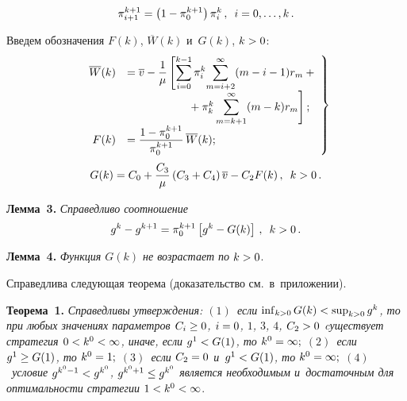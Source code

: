 \begin{multicols}{2}
  \vspace*{-6pt}
  
  \noindent
  \begin{equation}
  \pi_{i+1}^{k+1}=\left(1- \pi_0^{k+1}\right) \pi_i^k\,,\enskip i=0,\ldots, k\,.
  \label{e10-aga}
  \end{equation}
  
  {Введем обозначения} $F(k)$, $\overline{W}(k)$ и~$G(k)$, $k\hm>0$:
  \begin{equation}
  \left.
  \begin{array}{rl}
  \hspace*{-1mm}\overline{W}(k) &  = \displaystyle
  \overline{v}-\fr{1}{\mu}\left[ \sum\limits_{i=0}^{k-1} \pi_i^k \!
\sum\limits^\infty_{m=i+2} (m-i-1) r_m +{}\right.\\[6pt]
&\left.\hspace*{19mm}{}+\pi_k^k\displaystyle \sum\limits^\infty_{m=k+1} (m-
k)r_m\right];\\[6pt]
  \hspace*{-1mm}F(k) &=\displaystyle\fr{1-\pi_0^{k+1}}{\pi_0^{k+1}}\,\overline{W}(k);
   \end{array}\!\!
   \right\}\!\!
   \label{e11-aga}
   \end{equation}
   \begin{equation}
   G(k) = C_0+\displaystyle\frac{\displaystyle C_3\mathstrut}{\displaystyle \mu\mathstrut} \left( C_3+C_4\right) \overline{v} -C_2 F(k)\,,\enskip k>0\,.
   \label{e12-aga}
   \end{equation}
  
  \noindent
  \textbf{Лемма~3.} \textit{Справедливо соотношение}
  \begin{equation}
  g^k-g^{k+1} =\pi_0^{k+1}\left[ g^k-G(k)\right]\,,\enskip k>0\,.
  \label{e13-aga}
  \end{equation}
  
  \noindent
  \textbf{Лемма~4.} \textit{Функция $G(k)$ не возрастает по} $k\hm>0$.
  
  \smallskip
  
  Справедлива следующая теорема (доказательство см.\ в~приложении).
  
  \smallskip
  
  \noindent
  \textbf{Теорема~1.} \textit{Справедливы утверждения: $(1)$~если 
$\mathop{\mathrm{inf}}\nolimits_{k>0} G(k)\hm< \mathop{\mathrm{sup}}\nolimits_{k>0} g^k$, то 
при любых значениях параметров $C_i\hm\geq 0$, $i\hm= 0$, $1$, $3$, $4$, 
$C_2\hm>0$ cуществует стратегия $0\hm< k^0\hm<\infty$, иначе, если $g^1\hm< 
G(1)$, то $k^0\hm=\infty;$ $(2)$~если $g^1\hm\geq G(1)$, то $k^0\hm=1;$ 
$(3)$~если $C_2\hm=0$ и~$g^1\hm< G(1)$, то $k^0\hm=\infty;$ $(4)$~условие $g^{k^0-
1}\hm< g^{k^0}$, $g^{k^0+1}\hm\leq g^{k^0}$ является необходимым 
и~достаточным для оптимальности стратегии} $1\hm< k^0\hm<\infty$.
  

\end{multicols}
